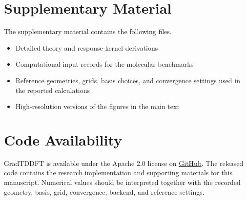 \documentclass[%
 aip,
 jmp,
 amsmath,amssymb,
 reprint, onecolumn
]{revtex4-1}
\begin{document}
\section*{Supplementary Material}

The supplementary material contains the following files.
\begin{itemize}
  \item Detailed theory and response-kernel derivations
  \item Computational input records for the molecular benchmarks
  \item Reference geometries, grids, basis choices, and convergence
    settings used in the reported calculations
  \item High-resolution versions of the figures in the main text
\end{itemize}

\section*{Code Availability}

GradTDDFT is available under the Apache 2.0 license on
\href{https://github.com/STOKES-DOT/TD-GradDFT}{GitHub}.
The released code contains the research implementation and supporting
materials for this manuscript. Numerical values should be interpreted
together with the recorded geometry, basis, grid, convergence, backend,
and reference settings.


\end{document}

